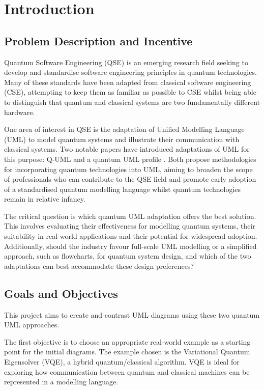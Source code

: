 \documentclass{article}
\begin{document}
\newpage

\section{Introduction}

\subsection{Problem Description and Incentive}

Quantum Software Engineering (QSE) is an emerging research field seeking to develop and standardise software engineering principles in quantum technologies. Many of these standards have been adapted from classical software engineering (CSE), attempting to keep them as familiar as possible to CSE whilst being able to distinguish that quantum and classical systems are two fundamentally different hardware. 

One area of interest in QSE is the adaptation of Unified Modelling Language (UML) to model quantum systems and illustrate their communication with classical systems. Two notable papers have introduced adaptations of UML for this purpose: Q-UML \cite{Pérez-Delgado2022} and a quantum UML profile \cite{Pérez-Castillo2022}. Both propose methodologies for incorporating quantum technologies into UML, aiming to broaden the scope of professionals who can contribute to the QSE field and promote early adoption of a standardised quantum modelling language whilst quantum technologies remain in relative infancy. 

The critical question is which quantum UML adaptation offers the best solution. This involves evaluating their effectiveness for modelling quantum systems, their suitability in real-world applications and their potential for widespread adoption. Additionally, should the industry favour full-scale UML modelling or a simplified approach, such as flowcharts, for quantum system design, and which of the two adaptations can best accommodate these design preferences?

\subsection{Goals and Objectives}

This project aims to create and contrast UML diagrams using these two quantum UML approaches.

The first objective is to choose an appropriate real-world example as a starting point for the initial diagrams. The example chosen is the Variational Quantum Eigensolver (VQE), a hybrid quantum/classical algorithm. VQE is ideal for exploring how communication between quantum and classical machines can be represented in a modelling language.
\end{document}
